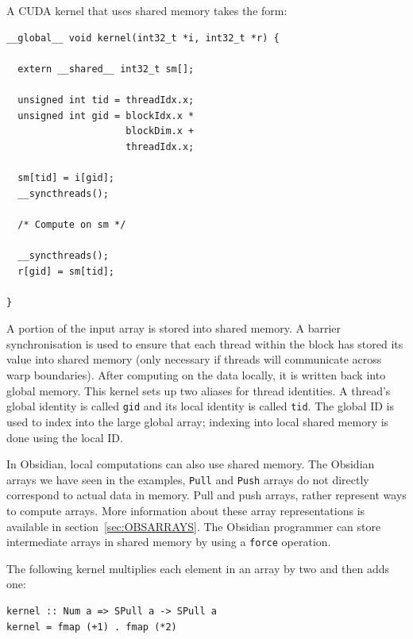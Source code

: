 \documentclass[a4paper]{book}
\begin{document}
\pagebreak 

\noindent A CUDA kernel that uses shared memory takes the form: 

\begin{small}
\begin{Verbatim}[samepage=true]
__global__ void kernel(int32_t *i, int32_t *r) {

  extern __shared__ int32_t sm[]; 

  unsigned int tid = threadIdx.x; 
  unsigned int gid = blockIdx.x * 
                     blockDim.x + 
                     threadIdx.x;

  sm[tid] = i[gid]; 
  __syncthreads();

  /* Compute on sm */ 
     
  __syncthreads();
  r[gid] = sm[tid]; 
  
}
\end{Verbatim} 
\end{small} 

\noindent A portion of the input array is stored into shared memory. A 
barrier synchronisation is used to ensure that each thread within the block 
has stored its value into shared memory (only necessary if threads will 
communicate across warp boundaries). After computing on the data locally, 
it is written back into global memory. This kernel sets up two aliases for 
thread identities. A thread's global identity is called {\tt gid} and its local 
identity is called {\tt tid}. The global ID is used to index into the large global 
array; indexing into local shared memory is done using the local ID. 

In Obsidian, local computations can also use shared memory. The Obsidian arrays 
we have seen in the examples, {\tt Pull} and {\tt Push} arrays do not directly 
correspond to actual data in memory. Pull and push arrays, rather represent ways 
to compute arrays. More information about these array representations is available 
in section~\ref{sec:OBSARRAYS}. The Obsidian programmer can store intermediate 
arrays in shared memory by using a {\tt force} operation. 

The following kernel multiplies each element in an array by two and then adds one: 

\begin{small}
\begin{Verbatim}[samepage=true] 
kernel :: Num a => SPull a -> SPull a
kernel = fmap (+1) . fmap (*2)
\end{Verbatim}
\end{small}
\end{document}
